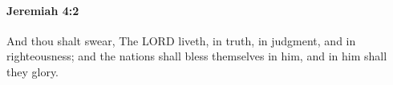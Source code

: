
		\paragraph{Jeremiah 4:2} %
			\label{JEREMIAH-4-2}

			And thou shalt swear, The LORD liveth, in truth, in judgment, and in righteousness; and the nations shall bless themselves in him, and in him shall they glory.


